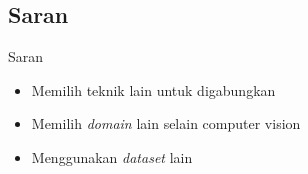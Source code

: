 \subsection{Saran}
\begin{frame}{Saran}
  \begin{itemize}
    \item Memilih teknik lain untuk digabungkan
    \item Memilih \textit{domain} lain selain computer vision
    \item Menggunakan \textit{dataset} lain
  \end{itemize}
\end{frame}
